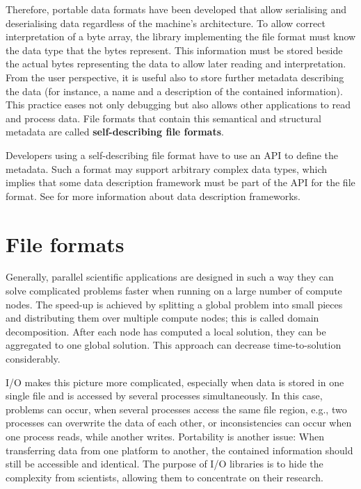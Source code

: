 Therefore, portable data formats have been developed that allow serialising and deserialising data regardless of the machine's architecture.
To allow correct interpretation of a byte array, the library implementing the file format must know the data type that the bytes represent.
This information must be stored beside the actual bytes representing the data to allow later reading and interpretation.
From the user perspective, it is useful also to store further metadata describing the data (for instance, a name and a description of the contained information).
This practice eases not only debugging but also allows other applications to read and process data.
File formats that contain this semantical and structural metadata are called \textbf{self-describing file formats}.

Developers using a self-describing file format have to use an API to define the metadata.
Such a format may support arbitrary complex data types, which implies that some data description framework must be part of the API for the file format.
See  for more information about data description frameworks.


\section{File formats}
\label{sec: background/file formats}


Generally, parallel scientific applications are designed in such a way they can solve complicated problems faster when running on a large number of compute nodes.
The speed-up is achieved by splitting a global problem into small pieces and distributing them over multiple compute nodes; this is called domain decomposition.
After each node has computed a local solution, they can be aggregated to one global solution.
This approach can decrease time-to-solution considerably.

I/O makes this picture more complicated, especially when data is stored in one single file and is accessed by several processes simultaneously.
In this case, problems can occur, when several processes access the same file region, e.g., two processes can overwrite the data of each other, or inconsistencies can occur when one process reads, while another writes.
Portability is another issue: When transferring data from one platform to another, the contained information should still be accessible and identical.
The purpose of I/O libraries is to hide the complexity from scientists, allowing them to concentrate on their research.



